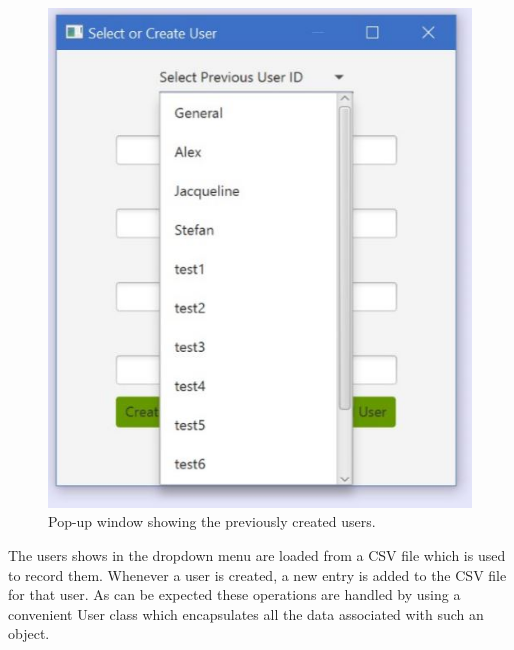 \begin{figure}[H]
\begin{minipage}{0.5\textwidth}
        \centering
        \includegraphics[scale=.55]{Figures/6_selectUserDropdown.JPG}%
        \caption{Pop-up window showing the previously created users.}
        \label{fig:selectOldUser}
    \end{minipage}
\end{figure}
The users shows in the dropdown menu are loaded from a CSV file which is used to record them. Whenever a user is created, a new entry is added to the CSV file for that user. As can be expected these operations are handled by using a convenient User class which encapsulates all the data associated with such an object. 

